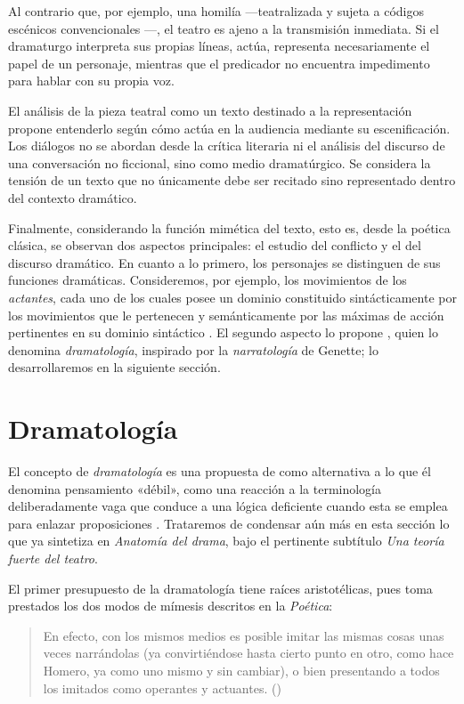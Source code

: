 Al contrario que, por ejemplo, una homilía —teatralizada y sujeta a códigos escénicos convencionales \parencite[318-319]{ebenhoch2015}—, el teatro es ajeno a la transmisión inmediata. Si el dramaturgo interpreta sus propias líneas, actúa, representa necesariamente el papel de un personaje, mientras que el predicador no encuentra impedimento para hablar con su propia voz.

El análisis de la pieza teatral como un texto destinado a la representación propone entenderlo según cómo actúa en la audiencia mediante su escenificación. Los diálogos no se abordan desde la crítica literaria ni el análisis del discurso de una conversación no ficcional, sino como medio dramatúrgico. Se considera la tensión de un texto que no únicamente debe ser recitado sino representado dentro del contexto dramático.

Finalmente, considerando la función mimética del texto, esto es, desde la poética clásica, se observan dos aspectos principales: el estudio del conflicto y el del discurso dramático. En cuanto a lo primero, los personajes se distinguen de sus funciones dramáticas. Consideremos, por ejemplo, los movimientos de los \textit{actantes}, cada uno de los cuales posee un dominio constituido sintácticamente por los movimientos que le pertenecen y semánticamente por las máximas de acción pertinentes en su dominio sintáctico \parencite[618-620]{schaeffer1995}. El segundo aspecto lo propone \citeauthor{garcia1991}, quien lo denomina \textit{dramatología}, inspirado por la \textit{narratología} de Genette; lo desarrollaremos en la siguiente sección.

\section{Dramatología}
El concepto de \textit{dramatología} es una propuesta de \citeauthor{garcia1991} como alternativa a lo que él denomina pensamiento «débil», como una reacción a la terminología deliberadamente vaga que conduce a una lógica deficiente cuando esta se emplea para enlazar proposiciones \parencite[40]{garcia2020}. Trataremos de condensar aún más en esta sección lo que \citeauthor{garcia2020} ya sintetiza en \textit{Anatomía del drama}, bajo el pertinente subtítulo \textit{Una teoría fuerte del teatro}.

El primer presupuesto de la dramatología tiene raíces aristotélicas, pues toma prestados los dos modos de mímesis descritos en la \textit{Poética}:
\blockquote{En efecto, con los mismos medios es posible imitar las mismas cosas unas veces narrándolas (ya convirtiéndose hasta cierto punto en otro, como hace Homero, ya como uno mismo y sin cambiar), o bien presentando a todos los imitados como operantes y actuantes. ()}

